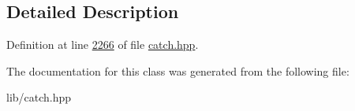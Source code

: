 \subsection{Detailed Description}


Definition at line \mbox{\hyperlink{catch_8hpp_source_l02266}{2266}} of file \mbox{\hyperlink{catch_8hpp_source}{catch.\+hpp}}.



The documentation for this class was generated from the following file\+:\begin{DoxyCompactItemize}
\item 
lib/catch.\+hpp\end{DoxyCompactItemize}
